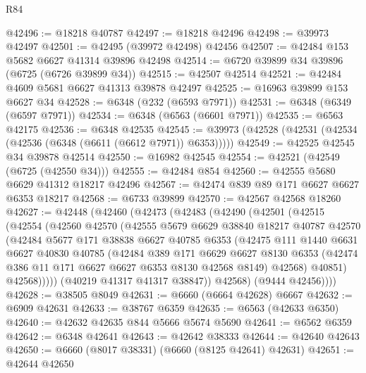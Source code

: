 \begin{lexlean}{R84}
\begin{coremodule}
@42496 := @18218 @40787
@42497 := @18218 @42496
@42498 := @39973 @42497
@42501 := @42495 (@39972 @42498) @42456
@42507 := @42484 @153 @5682 @6627 @41314 @39896 @42498
@42514 := @6720 @39899 @34 @39896 (@6725 (@6726 @39899 @34))
@42515 := @42507 @42514
@42521 := @42484 @4609 @5681 @6627 @41313 @39878 @42497
@42525 := @16963 @39899 @153 @6627 @34
@42528 := @6348 (@232 (@6593 @7971))
@42531 := @6348 (@6349 (@6597 @7971))
@42534 := @6348 (@6563 (@6601 @7971))
@42535 := @6563 @42175
@42536 := @6348 @42535
@42545 := @39973 (@42528 (@42531 (@42534 (@42536 (@6348 (@6611 (@6612 @7971)) @6353)))))
@42549 := @42525 @42545 @34 @39878 @42514
@42550 := @16982 @42545
@42554 := @42521 (@42549 (@6725 (@42550 @34)))
@42555 := @42484 @854
@42560 := @42555 @5680 @6629 @41312 @18217 @42496
@42567 := @42474 @839 @89 @171 @6627 @6627 @6353 @18217
@42568 := @6733 @39899
@42570 := @42567 @42568 @18260
@42627 := @42448
    (@42460
      (@42473
        (@42483
          (@42490
            (@42501
              (@42515
                (@42554
                  (@42560
                    @42570
                    (@42555
                      @5679
                      @6629
                      @38840
                      @18217
                      @40787
                      @42570
                      (@42484
                        @5677
                        @171
                        @38838
                        @6627
                        @40785
                        @6353
                        (@42475
                          @111
                          @1440
                          @6631
                          @6627
                          @40830
                          @40785
                          (@42484
                            @389
                            @171
                            @6629
                            @6627
                            @8130
                            @6353
                            (@42474 @386 @11 @171 @6627 @6627 @6353 @8130 @42568 @8149)
                            @42568)
                          @40851)
                        @42568)))))
              (@40219 @41317 @41317 @38847))
            @42568)
          (@9444 @42456))))
@42628 := @38505 @8049
@42631 := @6660 (@6664 @42628) @6667
@42632 := @6909 @42631
@42633 := @38767 @6359
@42635 := @6563 (@42633 @6350)
@42640 := @42632 @42635 @844 @5666 @5674 @5690
@42641 := @6562 @6359
@42642 := @6348 @42641
@42643 := @42642 @38333
@42644 := @42640 @42643
@42650 := @6660 (@8017 @38331) (@6660 (@8125 @42641) @42631)
@42651 := @42644 @42650

\end{coremodule}
\end{lexlean}
